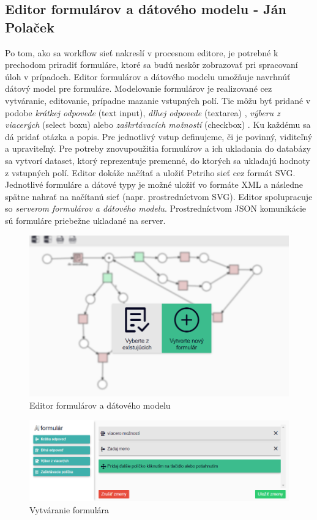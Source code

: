 \subsection{Editor formulárov a dátového modelu - Ján Polaček}
\label{editor formulárov}
Po tom, ako sa workflow sieť nakreslí v procesnom editore, je potrebné k prechodom priradiť formuláre, ktoré sa budú neskôr zobrazovať pri spracovaní úloh v prípadoch. Editor formulárov a dátového modelu umožňuje navrhnúť dátový model pre formuláre. Modelovanie formulárov je realizované cez vytváranie, editovanie, prípadne mazanie vstupných polí. Tie môžu byť pridané v podobe \emph{krátkej odpovede} (text input), \emph{dlhej odpovede} (textarea) , \emph{výberu z viacerých} (select boxu) 	alebo \emph{zaškrtávacích možností } (checkbox) . Ku každému sa dá pridať otázka a popis. Pre jednotlivý vstup definujeme, či je povinný, viditeľný a upraviteľný. Pre potreby znovupoužitia formulárov a ich ukladania do databázy sa vytvorí dataset, ktorý reprezentuje premenné, do ktorých sa ukladajú hodnoty z vstupných polí. Editor dokáže načítať a uložiť Petriho sieť cez formát SVG. Jednotlivé formuláre a dátové typy je možné uložiť vo formáte XML a následne spätne nahrať na načítanú sieť (napr. prostredníctvom SVG). Editor spolupracuje so \emph{serverom formulárov a dátového modelu}. Prostredníctvom JSON komunikácie sú formuláre priebežne ukladané na server.

\begin{figure}[h]
	\centering
	\includegraphics[width=0.7\linewidth]{images/jan1}
	\caption{Editor formulárov a dátového modelu}
	\label{fig:editor formulárov a dátového modelu}
\end{figure}


\begin{figure}[h]
	\centering
	\includegraphics[width=0.7\linewidth]{images/jan}
	\caption{Vytváranie formulára}
	\label{fig:editor formulárov a dátového modelu2}
\end{figure}


